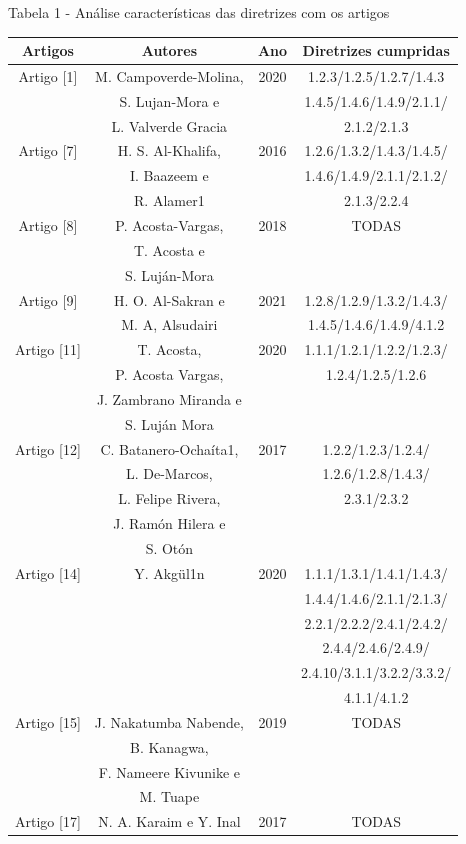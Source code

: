\documentclass[a4paper]{article}
\begin{document}
\begin{titlepage}
Tabela 1 - Análise características das diretrizes com os artigos\\[-1cm]
\begin{center}
	\fontsize{8pt}{8pt}\selectfont
	\begin{longtable}{|c|c|c|c|}
		\hline
		Artigos & Autores & Ano & Diretrizes cumpridas\\
		\hline
		Artigo [1] & M. Campoverde-Molina,& 2020 & 1.2.3/1.2.5/1.2.7/1.4.3\\
				   & S. Lujan-Mora e & & 1.4.5/1.4.6/1.4.9/2.1.1/\\
				   & L. Valverde Gracia & & 2.1.2/2.1.3\\
		\hline
		Artigo [7] & H. S. Al-Khalifa, & 2016 & 1.2.6/1.3.2/1.4.3/1.4.5/\\
				   & I. Baazeem e & & 1.4.6/1.4.9/2.1.1/2.1.2/\\
				   & R. Alamer1 & & 2.1.3/2.2.4\\
		\hline
		Artigo [8] & P. Acosta-Vargas, & 2018 & TODAS\\
				   & T. Acosta e & & \\
				   & S. Luján-Mora & & \\
		\hline
		Artigo [9] & H. O. Al-Sakran e & 2021 & 1.2.8/1.2.9/1.3.2/1.4.3/\\
				   & M. A, Alsudairi & & 1.4.5/1.4.6/1.4.9/4.1.2\\
		\hline
		Artigo [11] & T. Acosta, & 2020 & 1.1.1/1.2.1/1.2.2/1.2.3/\\
					& P. Acosta Vargas, & & 1.2.4/1.2.5/1.2.6\\
					& J. Zambrano Miranda e & & \\
					& S. Luján Mora & & \\
		\hline
		Artigo [12] & C. Batanero-Ochaíta1, & 2017 & 1.2.2/1.2.3/1.2.4/\\
					& L. De-Marcos, & & 1.2.6/1.2.8/1.4.3/\\
					& L. Felipe Rivera, & & 2.3.1/2.3.2\\
					& J. Ramón Hilera e & & \\
					& S. Otón & & \\
		\hline
		Artigo [14] & Y. Akgül1n & 2020 & 1.1.1/1.3.1/1.4.1/1.4.3/\\
					& & & 1.4.4/1.4.6/2.1.1/2.1.3/\\
					& & & 2.2.1/2.2.2/2.4.1/2.4.2/\\
					& & & 2.4.4/2.4.6/2.4.9/\\
					& & & 2.4.10/3.1.1/3.2.2/3.3.2/\\
					& & & 4.1.1/4.1.2\\
		\hline
		Artigo [15] & J. Nakatumba Nabende, & 2019 & TODAS\\
					& B. Kanagwa, & &\\
					& F. Nameere Kivunike e & &\\
					& M. Tuape & &\\
		\hline
		Artigo [17] & N. A. Karaim e Y. Inal & 2017 & TODAS\\
		\hline
	\end{longtable}
\end{center}


\end{titlepage}
\end{document}

